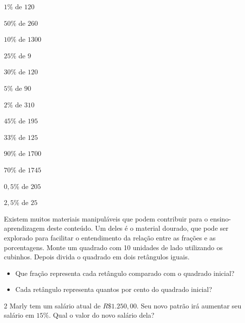 \begin{escolha}
\item $1\%$ de $120$ 
\item $50\%$ de $260$ 
\item $10\%$ de $1300$ 
\item $25\%$ de $9$ 
\item $30\%$ de $120$ 
\item $5\%$ de $90$ 
\item $2\%$ de $310$ 
\item $45\%$ de $195$ 
\item $33\%$ de $125$ 
\item $90\%$ de $1700$ 
\item $70\%$ de $1745$ 
\item $0,5\%$ de $205$ 
\item $2,5\%$ de $25$ 
\end{escolha}

\noindent Existem muitos materiais manipuláveis que podem contribuir para o
ensino-aprendizagem deste conteúdo. Um deles é o material dourado, que
pode ser explorado para facilitar o entendimento da relação entre as
frações e as porcentagens. Monte um quadrado com 10 unidades de lado utilizando os cubinhos. Depois divida o quadrado em dois retângulos iguais. 

\begin{itemize}
\item Que fração representa cada retângulo comparado com o quadrado inicial?
\item Cada retângulo representa quantos por cento do quadrado inicial?
\end{itemize}


\num{2}  Marly tem um salário atual de $R\$1.250,00$. Seu novo patrão irá
aumentar seu salário em $15\%$. Qual o valor do novo salário dela?

